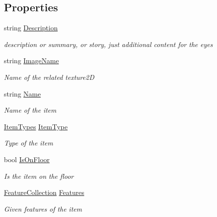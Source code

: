\subsection*{Properties}
\begin{DoxyCompactItemize}
\item 
string \hyperlink{class_hel_project_1_1_game_world_1_1_h_item_a4f099e28dcfc8bafe78bc5ca1a14aca5}{Description}
\begin{DoxyCompactList}\small\item\em description or summary, or story, just additional content for the eyes \end{DoxyCompactList}\item 
string \hyperlink{class_hel_project_1_1_game_world_1_1_h_item_a7791b24bb2f3ad7d02ae45054040e9aa}{Image\+Name}
\begin{DoxyCompactList}\small\item\em Name of the related texture2\+D \end{DoxyCompactList}\item 
string \hyperlink{class_hel_project_1_1_game_world_1_1_h_item_ad6e286a2833c7a01297544008e6e9e67}{Name}
\begin{DoxyCompactList}\small\item\em Name of the item \end{DoxyCompactList}\item 
\hyperlink{class_hel_project_1_1_game_world_1_1_h_item_a7440e7b22ff0e62bcaf89a513716357b}{Item\+Types} \hyperlink{class_hel_project_1_1_game_world_1_1_h_item_aeeb877e7d0f3aa3adf04c17c67bb385f}{Item\+Type}
\begin{DoxyCompactList}\small\item\em Type of the item \end{DoxyCompactList}\item 
bool \hyperlink{class_hel_project_1_1_game_world_1_1_h_item_a5fd0a52b0f490f80d0c7abec4b3293c5}{Is\+On\+Floor}
\begin{DoxyCompactList}\small\item\em Is the item on the floor \end{DoxyCompactList}\item 
\hyperlink{class_hel_project_1_1_features_1_1_feature_collection}{Feature\+Collection} \hyperlink{class_hel_project_1_1_game_world_1_1_h_item_a62269e669b1ff06f017424341ffd7cb9}{Features}
\begin{DoxyCompactList}\small\item\em Given features of the item \end{DoxyCompactList}\end{DoxyCompactItemize}
